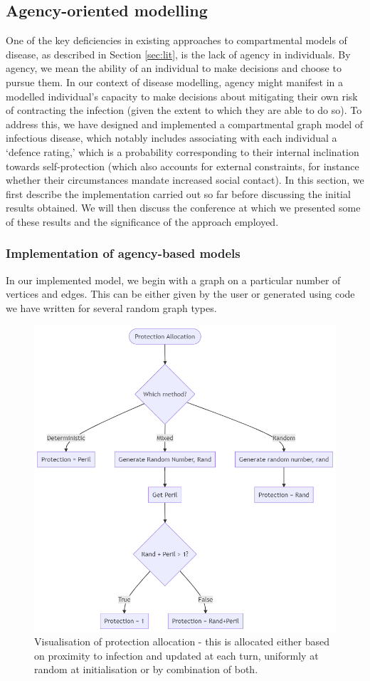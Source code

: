 \documentclass[../report.tex]{subfiles}
\begin{document}
\subsection{Agency-oriented modelling}

One of the key deficiencies in existing approaches to compartmental models of disease, as described in Section \ref{sec:lit}, is the lack of agency in individuals. By agency, we mean the ability of an individual to make decisions and choose to pursue them. In our context of disease modelling, agency might manifest in a modelled individual's capacity to make decisions about mitigating their own risk of contracting the infection (given the extent to which they are able to do so). To address this, we have designed and implemented a compartmental graph model of infectious disease, which notably includes associating with each individual a `defence rating,' which is a probability corresponding to their internal inclination towards self-protection (which also accounts for external constraints, for instance whether their circumstances mandate increased social contact). In this section, we first describe the implementation carried out so far before discussing the initial results obtained. We will then discuss the conference at which we presented some of these results and the significance of the approach employed.

\subsubsection{Implementation of agency-based models}

In our implemented model, we begin with a graph on a particular number of vertices and edges. This can be either given by the user or generated using code we have written for several random graph types.

\begin{figure}[!ht] 
  \centering
  \includegraphics[width=0.75\linewidth]{assets/protection}
  \caption{Visualisation of protection allocation - this is allocated either based on proximity to infection and updated at each turn, uniformly at random at initialisation or by combination of both.}
  \label{fig:protection}
\end{figure}
\end{document}

